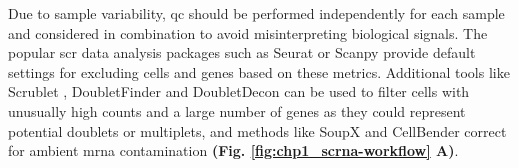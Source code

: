 \par Due to sample variability, \gls{qc} should be performed independently for each sample and considered in combination to avoid misinterpreting biological signals. The popular \gls{scr} data analysis packages such as Seurat \textbf{\cite{butler_integrating_2018,stuart_comprehensive_2019,hao_integrated_2021}} or Scanpy \textbf{\cite{wolf_scanpy_2018}} provide default settings for excluding cells and genes based on these metrics. Additional tools like Scrublet \textbf{\cite{wolock_scrublet_2019}}, DoubletFinder \textbf{\cite{mcginnis_doubletfinder_2019}} and DoubletDecon \textbf{\cite{depasquale_doubletdecon:_2019}} can be used to filter cells with unusually high counts and a large number of genes as they could represent potential doublets or multiplets, and methods like SoupX \textbf{\cite{young_soupx_2020}} and CellBender \textbf{\cite{fleming_unsupervised_2023}} correct for ambient \gls{mrna} contamination \textbf{(Fig. \ref{fig:chp1_scrna-workflow} A)}.


